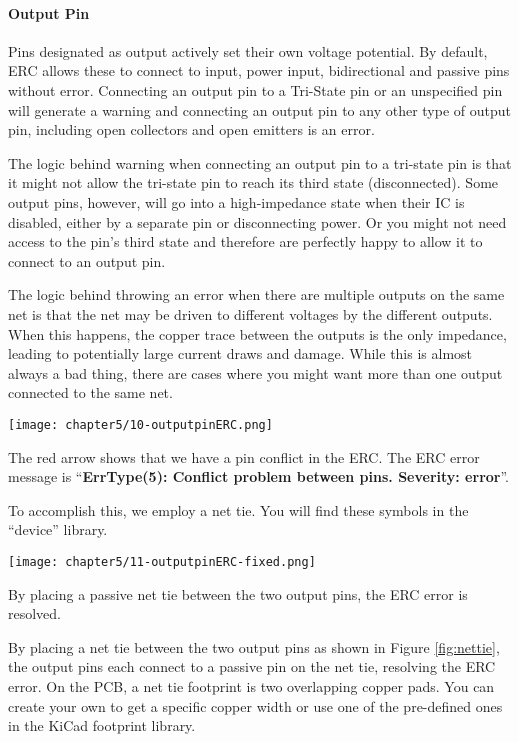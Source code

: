 \paragraph{Output Pin} Pins designated as output actively set their own voltage potential.
By default, ERC allows these to connect to input, power input, bidirectional and passive pins without error.
Connecting an output pin to a Tri-State pin or an unspecified pin will generate a warning and connecting an output pin to any other type of output pin, including open collectors and open emitters is an error.

The logic behind warning when connecting an output pin to a tri-state pin is that it might not allow the tri-state pin to reach its third state (disconnected).
Some output pins, however, will go into a high-impedance state when their IC is disabled, either by a separate pin or disconnecting power.
Or you might not need access to the pin's third state and therefore are perfectly happy to allow it to connect to an output pin.

The logic behind throwing an error when there are multiple outputs on the same net is that the net may be driven to different voltages by the different outputs.
When this happens, the copper trace between the outputs is the only impedance, leading to potentially large current draws and damage.
While this is almost always a bad thing, there are cases where you might want more than one output connected to the same net.
\begin{marginfigure}[-2in]
	\texttt{[image: chapter5/10-outputpinERC.png]}
	\caption[Error connecting output pins]{
		The red arrow shows that we have a pin conflict in the ERC.
		The ERC error message is ``\textbf{ErrType(5): Conflict problem between pins. Severity: error}''.
	}
\end{marginfigure}
To accomplish this, we employ a net tie.
You will find these symbols in the ``device'' library.
\begin{marginfigure}
	\texttt{[image: chapter5/11-outputpinERC-fixed.png]}
	\caption[How to connect output pins]{
		By placing a passive net tie between the two output pins, the ERC error is resolved.
	}
	\label{fig:nettie}
\end{marginfigure}
By placing a net tie between the two output pins as shown in Figure \ref{fig:nettie}, the output pins each connect to a passive pin on the net tie, resolving the ERC error.
On the PCB, a net tie footprint is two overlapping copper pads.
You can create your own to get a specific copper width or use one of the pre-defined ones in the KiCad footprint library.

